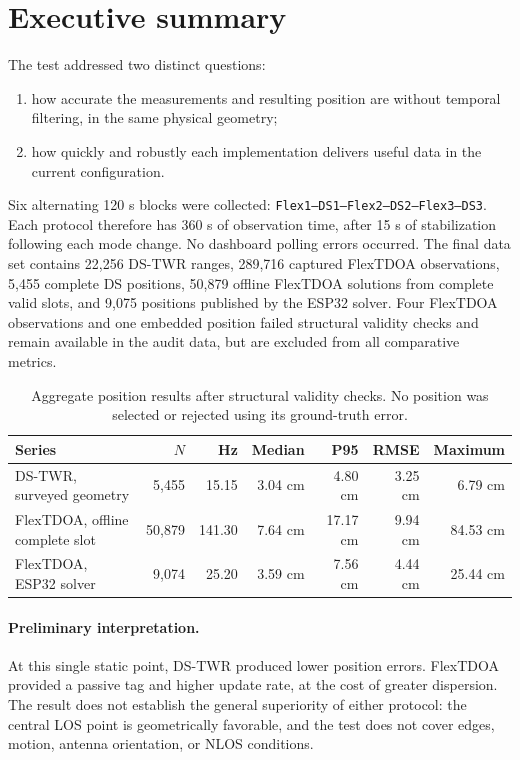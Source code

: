 \documentclass[11pt,a4paper]{article}
\begin{document}
\section{Executive summary}

The test addressed two distinct questions:

\begin{enumerate}[leftmargin=7mm]
  \item how accurate the measurements and resulting position are without
  temporal filtering, in the same physical geometry;
  \item how quickly and robustly each implementation delivers useful data in
  the current configuration.
\end{enumerate}

Six alternating 120 s blocks were collected:
\texttt{Flex1--DS1--Flex2--DS2--Flex3--DS3}. Each protocol therefore has
360 s of observation time, after 15 s of stabilization following each mode
change. No dashboard polling errors occurred. The final data set contains
22,256 DS-TWR ranges, 289,716 captured FlexTDOA observations, 5,455 complete
DS positions, 50,879 offline FlexTDOA solutions from complete valid slots, and
9,075 positions published by the ESP32 solver. Four FlexTDOA observations and
one embedded position failed structural validity checks and remain available
in the audit data, but are excluded from all comparative metrics.

\begin{table}[H]
  \centering
  \caption{Aggregate position results after structural validity checks. No
  position was selected or rejected using its ground-truth error.}
  \footnotesize
  \begin{tabular}{lrrrrrr}
    \toprule
    Series & $N$ & Hz & Median & P95 & RMSE & Maximum\\
    \midrule
    DS-TWR, surveyed geometry
      & 5,455 & 15.15 & 3.04 cm & 4.80 cm & 3.25 cm & 6.79 cm\\
    FlexTDOA, offline complete slot
      & 50,879 & 141.30 & 7.64 cm & 17.17 cm & 9.94 cm & 84.53 cm\\
    FlexTDOA, ESP32 solver
      & 9,074 & 25.20 & 3.59 cm & 7.56 cm & 4.44 cm & 25.44 cm\\
    \bottomrule
  \end{tabular}
\end{table}

\paragraph{Preliminary interpretation.}
At this single static point, DS-TWR produced lower position errors. FlexTDOA
provided a passive tag and higher update rate, at the cost of greater
dispersion. The result does not establish the general superiority of either
protocol: the central LOS point is geometrically favorable, and the test does
not cover edges, motion, antenna orientation, or NLOS conditions.
\end{document}
